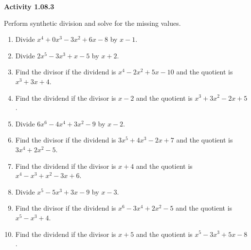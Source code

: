 \vspace{0.3ex}
\noindent\textbf{Activity 1.08.3}

\vspace{0.2ex}

Perform synthetic division and solve for the missing values.
\begin{enumerate}
    \item Divide \(x^4 + 0x^3 - 3x^2 + 6x - 8\) by \(x - 1\).
    \item Divide \(2x^5 - 3x^3 + x - 5\) by \(x + 2\).
    \item Find the divisor if the dividend is \(x^4 - 2x^2 + 5x - 10\) and the quotient is \(x^3 + 3x + 4\).
    \item Find the dividend if the divisor is \(x - 2\) and the quotient is \(x^3 + 3x^2 - 2x + 5\).
    \item Divide \(6x^6 - 4x^4 + 3x^2 - 9\) by \(x - 2\).
    \item Find the divisor if the dividend is \(3x^5 + 4x^3 - 2x + 7\) and the quotient is \(3x^4 + 2x^2 - 5\).
    \item Find the dividend if the divisor is \(x + 4\) and the quotient is \(x^4 - x^3 + x^2 - 3x + 6\).
    \item Divide \(x^5 - 5x^3 + 3x - 9\) by \(x - 3\).
    \item Find the divisor if the dividend is \(x^6 - 3x^4 + 2x^2 - 5\) and the quotient is \(x^5 - x^3 + 4\).
    \item Find the dividend if the divisor is \(x + 5\) and the quotient is \(x^5 - 3x^3 + 5x - 8\).
\end{enumerate}
